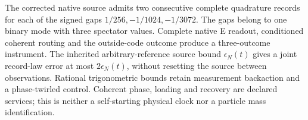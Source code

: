 The corrected native source admits two consecutive complete quadrature
records for each of the signed gaps $1/256,-1/1024,-1/3072$.  The gaps belong
to one binary mode with three spectator values.  Complete native E readout,
conditioned coherent routing and the outside-code outcome produce a
three-outcome instrument.  The inherited arbitrary-reference source bound
$\epsilon_N(t)$ gives a joint record-law error at most $2\epsilon_N(t)$,
without resetting the source between observations.  Rational trigonometric
bounds retain measurement backaction and a phase-twirled control.  Coherent
phase, loading and recovery are declared services; this is neither a
self-starting physical clock nor a particle mass identification.
